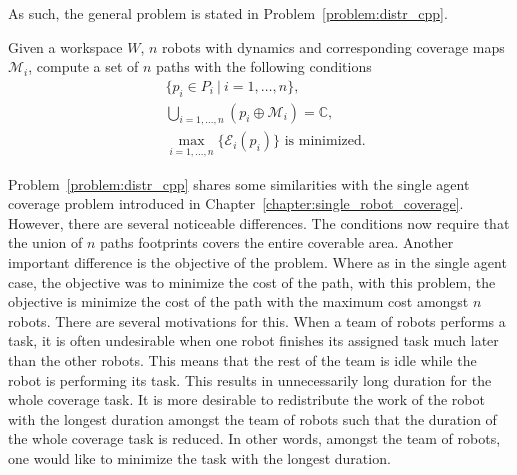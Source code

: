 \documentclass[../main.tex]{subfiles}
\begin{document}
As such, the general problem is stated in Problem~\ref{problem:distr_cpp}.

\begin{problem}
\label{problem:distr_cpp}
	Given a workspace $W$, $n$ robots with dynamics and corresponding coverage maps $\mathcal{M}_i$, compute a set of $n$ paths with the following conditions
	\begin{equation}
	\begin{aligned}
		& \{p_i\in P_{i}\ |\ i=1,\dots,n\},\\
		& \bigcup_{i=1,\dots,n}(p_i\oplus\mathcal{M}_i)=\mathbb{C},\\
		& \max_{i=1,\ldots,n}\{\mathcal{E}_i(p_i)\}\text{ is minimized.}
	\end{aligned}
	\end{equation}
\end{problem}

Problem~\ref{problem:distr_cpp} shares some similarities with the single agent coverage problem introduced in Chapter~\ref{chapter:single_robot_coverage}. However, there are several noticeable differences. %
The conditions now require that the union of $n$ paths footprints covers the entire coverable area. Another important difference is the objective of the problem. Where as in the single agent case, the objective was to minimize the cost of the path, with this problem, the objective is minimize the cost of the path with the maximum cost amongst $n$ robots. There are several motivations for this. When a team of robots performs a task, it is often undesirable when one robot finishes its assigned task much later than the other robots. This means that the rest of the team is idle while the robot is performing its task. This results in unnecessarily long duration for the whole coverage task. It is more desirable to redistribute the work of the robot with the longest duration amongst the team of robots such that the duration of the whole coverage task is reduced. In other words, amongst the team of robots, one would like to minimize the task with the longest duration.
\end{document}
